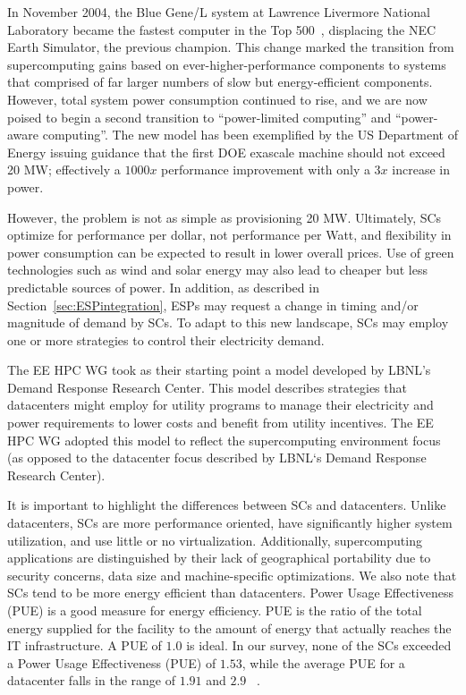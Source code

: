 In November 2004, the Blue Gene/L system at Lawrence Livermore National Laboratory
became the fastest computer in the Top 500~\cite{Top500}, displacing the NEC Earth Simulator,
the previous champion. This change marked the transition from supercomputing gains based
on ever-higher-performance components to systems that comprised of far larger numbers of 
slow but energy-efficient components. However, total system power consumption continued to rise,
and we are now poised to begin a second transition to ``power-limited computing'' and ``power-aware computing''. The new
model has been exemplified by the US Department of Energy issuing guidance that the first
DOE exascale machine should not exceed 20 MW; effectively a $1000x$ performance improvement
with only a $3x$ increase in power. 

However, the problem is not as simple as provisioning 20 MW. Ultimately, SCs optimize for
performance per dollar, not performance per Watt, and flexibility in power consumption
can be expected to result in lower overall prices. Use of green technologies such as
wind and solar energy may also lead to cheaper but less predictable sources of power.
In addition, as described in Section~\ref{sec:ESPintegration}, ESPs may request a change in timing and/or magnitude of demand by SCs. To adapt to this new landscape, SCs may employ one or more strategies to control their electricity demand. 

The EE HPC WG took as their starting point a
model developed by LBNL's Demand Response Research
Center. This model describes strategies that datacenters might employ for utility programs to manage their electricity and
power requirements to lower costs and benefit from utility
incentives. The EE HPC WG adopted this model %
to reflect the supercomputing environment
focus (as opposed to %
the datacenter focus described by LBNL`s Demand
Response Research Center).

It is important to highlight the differences between SCs and datacenters. Unlike datacenters, SCs are more performance oriented, have significantly higher system utilization, and use little or no virtualization. 
Additionally, supercomputing
applications are distinguished by their lack of geographical
portability due to security concerns, data size and machine-specific
optimizations.  
%
We also note that SCs tend to be more
energy efficient than datacenters. Power Usage Effectiveness (PUE) is a good measure for energy efficiency. PUE is the ratio of the total energy supplied for the facility to the amount of energy that actually reaches the IT infrastructure. A PUE of $1.0$ is ideal. In our survey, none of the SCs exceeded a Power Usage Effectiveness (PUE) of $1.53$, while the average PUE for a datacenter falls in the range of $1.91$ and $2.9$ ~\cite{Niccolai}.

